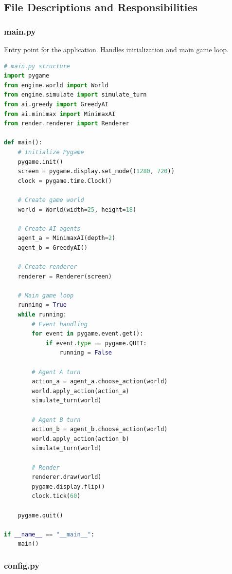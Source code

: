 \documentclass[12pt,a4paper]{article}
\begin{document}
\subsection{File Descriptions and Responsibilities}

\subsubsection{main.py}

Entry point for the application. Handles initialization and main game loop.

\begin{lstlisting}[language=Python]
# main.py structure
import pygame
from engine.world import World
from engine.simulate import simulate_turn
from ai.greedy import GreedyAI
from ai.minimax import MinimaxAI
from render.renderer import Renderer

def main():
    # Initialize Pygame
    pygame.init()
    screen = pygame.display.set_mode((1280, 720))
    clock = pygame.time.Clock()
    
    # Create game world
    world = World(width=25, height=18)
    
    # Create AI agents
    agent_a = MinimaxAI(depth=2)
    agent_b = GreedyAI()
    
    # Create renderer
    renderer = Renderer(screen)
    
    # Main game loop
    running = True
    while running:
        # Event handling
        for event in pygame.event.get():
            if event.type == pygame.QUIT:
                running = False
        
        # Agent A turn
        action_a = agent_a.choose_action(world)
        world.apply_action(action_a)
        simulate_turn(world)
        
        # Agent B turn
        action_b = agent_b.choose_action(world)
        world.apply_action(action_b)
        simulate_turn(world)
        
        # Render
        renderer.draw(world)
        pygame.display.flip()
        clock.tick(60)
    
    pygame.quit()

if __name__ == "__main__":
    main()
\end{lstlisting}

\subsubsection{config.py}
\end{document}
